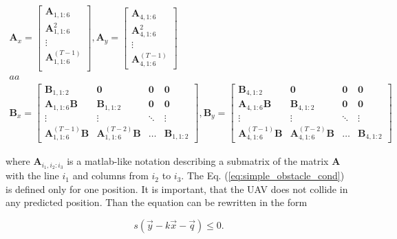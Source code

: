 \documentclass[a4paper,11pt,titlepage]{article}
\begin{document}
\begin{equation}
\begin{split}
\textbf{A}_x = 
\begin{bmatrix}
\textbf{A}_{1, 1:6} \\
\textbf{A}^2_{1, 1:6} \\
\vdots \\
\textbf{A}^{(T-1)}_{1, 1:6} \\
\end{bmatrix}, 
\textbf{A}_y = 
\begin{bmatrix}
\textbf{A}_{4, 1:6} \\
\textbf{A}^2_{4, 1:6} \\
\vdots \\
\textbf{A}^{(T-1)}_{4, 1:6}
\end{bmatrix}\\
aa\\
\textbf{B}_x = 
\begin{bmatrix}
\textbf{B}_{1, 1:2} & \textbf{0} & \textbf{0} & \textbf{0} \\
\textbf{A}_{1, 1:6}\textbf{B} & \textbf{B}_{1, 1:2} & \textbf{0} & \textbf{0} \\
\vdots & \vdots & \ddots & \vdots \\
\textbf{A}^{(T-1)}_{1, 1:6}\textbf{B} & \textbf{A}^{(T-2)}_{1, 1:6}\textbf{B} & \hdots & \textbf{B}_{1, 1:2}
\end{bmatrix}
,
\textbf{B}_y = 
\begin{bmatrix}
\textbf{B}_{4, 1:2} & \textbf{0} & \textbf{0} & \textbf{0} \\
\textbf{A}_{4, 1:6}\textbf{B} & \textbf{B}_{4, 1:2} & \textbf{0} & \textbf{0} \\
\vdots & \vdots & \ddots & \vdots \\
\textbf{A}^{(T-1)}_{4, 1:6}\textbf{B} & \textbf{A}^{(T-2)}_{4, 1:6}\textbf{B} & \hdots & \textbf{B}_{4, 1:2}
\end{bmatrix}
\end{split}
\end{equation}

where $\textbf{A}_{i_1, i_2:i_3}$ is a matlab-like notation describing a submatrix of the matrix $\textbf{A}$ with the line $i_1$ and columns from $i_2$ to $i_3$. The Eq. (\ref{eq:simple_obstacle_cond}) is defined only for one position. It is important, that the UAV does not collide in any predicted position. Than the equation can be rewritten in the form 

\begin{equation}
\label{eq:vector_obstacle_cond}
s(\vec{y} - k\vec{x} - \vec{q}) \leq 0.
\end{equation}
\end{document}
